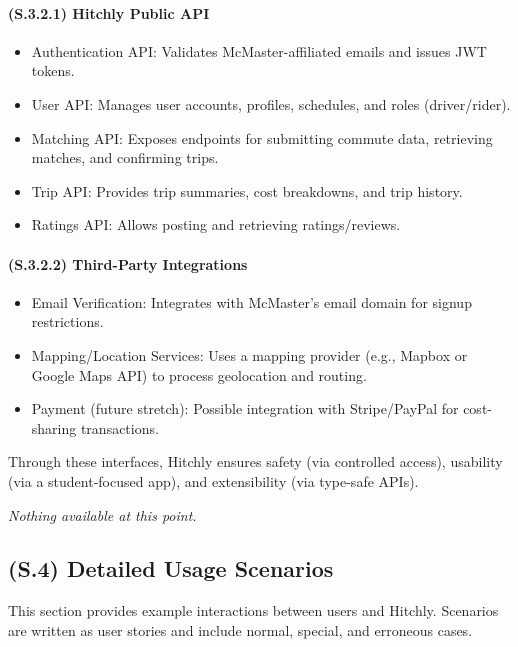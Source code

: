 \documentclass[12pt,letterpaper]{article}
\begin{document}
\paragraph{(S.3.2.1) Hitchly Public API} %
\begin{itemize}
    \item Authentication API: Validates McMaster-affiliated emails and issues JWT tokens.
    \item User API: Manages user accounts, profiles, schedules, and roles (driver/rider).
    \item Matching API: Exposes endpoints for submitting commute data, retrieving matches, and confirming trips.
    \item Trip API: Provides trip summaries, cost breakdowns, and trip history.
    \item Ratings API: Allows posting and retrieving ratings/reviews.
\end{itemize}

\paragraph{(S.3.2.2) Third-Party Integrations} %
\begin{itemize}
    \item Email Verification: Integrates with McMaster’s email domain for signup restrictions.
    \item Mapping/Location Services: Uses a mapping provider (e.g., Mapbox or Google Maps API) to process geolocation and routing.
    \item Payment (future stretch): Possible integration with Stripe/PayPal for cost-sharing transactions.
\end{itemize}

Through these interfaces, Hitchly ensures safety (via controlled access), usability (via a student-focused app), and extensibility (via type-safe APIs).

\textit{Nothing available at this point.}

\subsection{(S.4) Detailed Usage Scenarios} %

This section provides example interactions between users and Hitchly. Scenarios are written as user stories and include normal, special, and erroneous cases.
\end{document}
